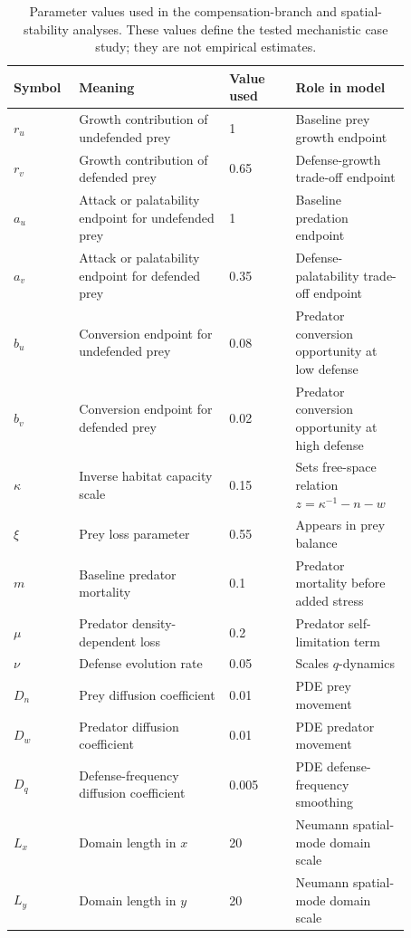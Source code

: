 \documentclass[11pt]{article}
\begin{document}
\begin{table}[htbp]
  \centering
  \caption{Parameter values used in the compensation-branch and spatial-stability analyses. These values define the tested mechanistic case study; they are not empirical estimates.}
  \label{tab:parameters}
  \small
  \begin{tabular}{p{0.12\linewidth}p{0.34\linewidth}p{0.15\linewidth}p{0.26\linewidth}}
    \toprule
    Symbol & Meaning & Value used & Role in model \\
    \midrule
    \(r_u\) & Growth contribution of undefended prey & 1 & Baseline prey growth endpoint \\
    \(r_v\) & Growth contribution of defended prey & 0.65 & Defense-growth trade-off endpoint \\
    \(a_u\) & Attack or palatability endpoint for undefended prey & 1 & Baseline predation endpoint \\
    \(a_v\) & Attack or palatability endpoint for defended prey & 0.35 & Defense-palatability trade-off endpoint \\
    \(b_u\) & Conversion endpoint for undefended prey & 0.08 & Predator conversion opportunity at low defense \\
    \(b_v\) & Conversion endpoint for defended prey & 0.02 & Predator conversion opportunity at high defense \\
    \(\kappa\) & Inverse habitat capacity scale & 0.15 & Sets free-space relation \(z=\kappa^{-1}-n-w\) \\
    \(\xi\) & Prey loss parameter & 0.55 & Appears in prey balance \\
    \(m\) & Baseline predator mortality & 0.1 & Predator mortality before added stress \\
    \(\mu\) & Predator density-dependent loss & 0.2 & Predator self-limitation term \\
    \(\nu\) & Defense evolution rate & 0.05 & Scales \(q\)-dynamics \\
    \(D_n\) & Prey diffusion coefficient & 0.01 & PDE prey movement \\
    \(D_w\) & Predator diffusion coefficient & 0.01 & PDE predator movement \\
    \(D_q\) & Defense-frequency diffusion coefficient & 0.005 & PDE defense-frequency smoothing \\
    \(L_x\) & Domain length in \(x\) & 20 & Neumann spatial-mode domain scale \\
    \(L_y\) & Domain length in \(y\) & 20 & Neumann spatial-mode domain scale \\
    \bottomrule
  \end{tabular}
\end{table}
\end{document}
